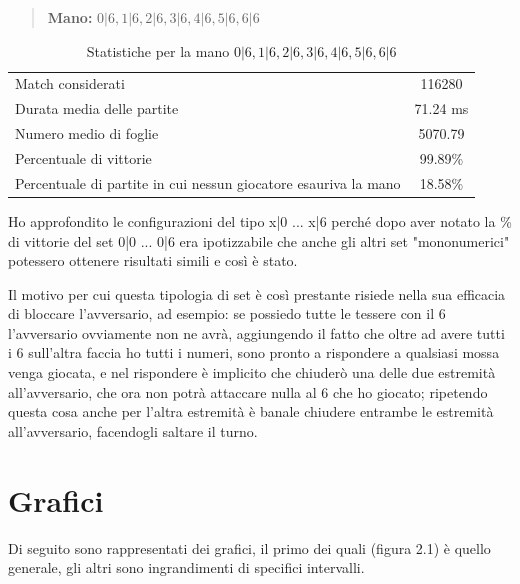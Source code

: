 \documentclass[a4paper,12pt]{report} %
\begin{document}
\begin{quote}
    \textbf{Mano:} \(0|6, 1|6, 2|6, 3|6, 4|6, 5|6, 6|6\)
\end{quote}

\begin{table}[h!]
    \centering
    \begin{tabular}{|l|c|}
        \hline
        Match considerati & 116280 \\
        Durata media delle partite &  71.24 ms \\
        Numero medio di foglie &  5070.79 \\
        Percentuale di vittorie & 99.89\% \\
        Percentuale di partite in cui nessun giocatore esauriva la mano &  18.58\% \\
        \hline
    \end{tabular}
    \caption{Statistiche per la mano \(0|6, 1|6, 2|6, 3|6, 4|6, 5|6, 6|6\)}
    \label{tab:stats_tutti_6}
\end{table}

Ho approfondito le configurazioni del tipo x|0 ... x|6 perché dopo aver notato la \% di vittorie del set 0|0 ... 0|6 era ipotizzabile che anche gli altri set "mononumerici" potessero ottenere risultati simili e così è stato.

Il motivo per cui questa tipologia di set è così prestante risiede nella sua efficacia di bloccare l'avversario, ad esempio: se possiedo tutte le tessere con il 6 l'avversario ovviamente non ne avrà, aggiungendo il fatto che oltre ad avere tutti i 6 sull'altra faccia ho tutti i numeri, sono pronto a rispondere a qualsiasi mossa venga giocata, e nel rispondere è implicito che chiuderò una delle due estremità all'avversario, che ora non potrà attaccare nulla al 6 che ho giocato; ripetendo questa cosa anche per l'altra estremità è banale chiudere entrambe le estremità all'avversario, facendogli saltare il turno.



\section{Grafici}

Di seguito sono rappresentati dei grafici, il primo dei quali (figura 2.1) è quello generale, gli altri sono ingrandimenti di specifici intervalli.
\end{document}
